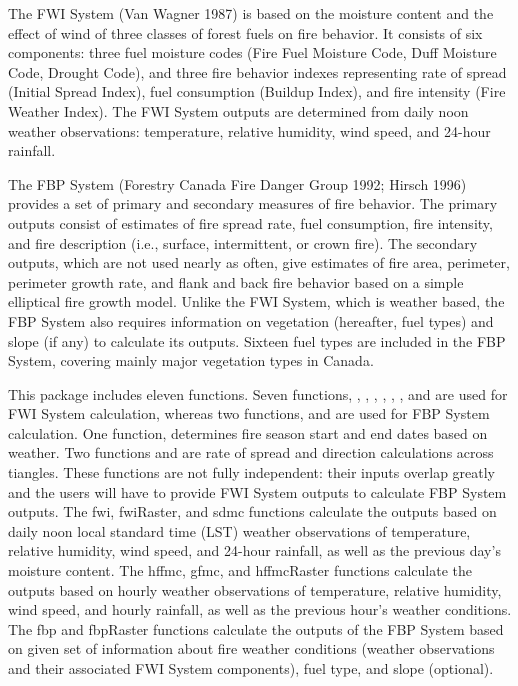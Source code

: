 \documentclass[a4paper]{book}
\begin{document}
\begin{Details}\relax
The FWI System (Van Wagner 1987) is based on the moisture content and the
effect of wind of three classes of forest fuels on fire behavior. It
consists of six components: three fuel moisture codes (Fire Fuel Moisture
Code, Duff Moisture Code, Drought Code), and three fire behavior indexes
representing rate of spread (Initial Spread Index), fuel consumption
(Buildup Index), and fire intensity (Fire Weather Index). The FWI System
outputs are determined from daily noon weather observations: temperature,
relative humidity, wind speed, and 24-hour rainfall.

The FBP System (Forestry Canada Fire Danger Group 1992; Hirsch 1996)
provides a set of primary and secondary measures of fire behavior. The
primary outputs consist of estimates of fire spread rate, fuel consumption,
fire intensity, and fire description (i.e., surface, intermittent, or crown
fire). The secondary outputs, which are not used nearly as often, give
estimates of fire area, perimeter, perimeter growth rate, and flank and back
fire behavior based on a simple elliptical fire growth model. Unlike the FWI
System, which is weather based, the FBP System also requires information on
vegetation (hereafter, fuel types) and slope (if any) to calculate its
outputs. Sixteen fuel types are included in the FBP System, covering mainly
major vegetation types in Canada.


 This package
includes eleven functions. Seven functions, ,
, , ,
, , and  are used for
FWI System calculation, whereas two functions,  and
 are used for FBP System calculation. One function,
 determines fire season start and end dates based on
weather. Two functions  and  are rate of
spread and direction calculations across tiangles. These functions are not
fully independent: their inputs overlap greatly and the users will have to
provide FWI System outputs to calculate FBP System outputs. The fwi,
fwiRaster, and sdmc functions calculate the outputs based on daily noon
local standard time (LST) weather observations of temperature, relative
humidity, wind speed, and 24-hour rainfall, as well as the previous day's
moisture content. The hffmc, gfmc, and hffmcRaster functions calculate the
outputs based on hourly weather observations of temperature, relative
humidity, wind speed, and hourly rainfall, as well as the previous hour's
weather conditions. The fbp and fbpRaster functions calculate the outputs of
the FBP System based on given set of information about fire weather
conditions (weather observations and their associated FWI System
components), fuel type, and slope (optional).
\end{Details}
\end{document}
